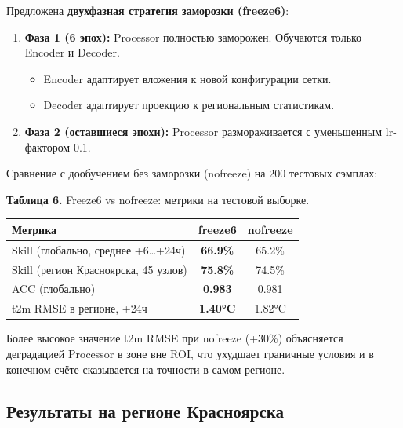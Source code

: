 \documentclass[14pt,a4paper]{extarticle}
\newcounter{none}
\numberwithin{table}{section}
\numberwithin{figure}{section}
\numberwithin{equation}{section}
\providecommand{\tightlist}{%
  \setlength{\itemsep}{0pt}\setlength{\parskip}{0pt}}
\begin{document}
Предложена \textbf{двухфазная стратегия заморозки (freeze6)}:

\begin{enumerate}
\def\labelenumi{\arabic{enumi}.}
\tightlist
\item
  \textbf{Фаза 1 (6 эпох):} Processor полностью заморожен. Обучаются
  только Encoder и Decoder.

  \begin{itemize}
  \tightlist
  \item
    Encoder адаптирует вложения к новой конфигурации сетки.
  \item
    Decoder адаптирует проекцию к региональным статистикам.
  \end{itemize}
\item
  \textbf{Фаза 2 (оставшиеся эпохи):} Processor размораживается с
  уменьшенным lr-фактором 0.1.
\end{enumerate}

Сравнение с дообучением без заморозки (nofreeze) на 200 тестовых
сэмплах:

\textbf{Таблица 6.} Freeze6 vs nofreeze: метрики на тестовой выборке.

{\def\LTcaptype{none} %
\begin{longtable}[]{@{}lcc@{}}
\toprule\noalign{}
Метрика & freeze6 & nofreeze \\
\midrule\noalign{}
\endhead
\bottomrule\noalign{}
\endlastfoot
Skill (глобально, среднее +6\ldots+24ч) & \textbf{66.9\%} & 65.2\% \\
Skill (регион Красноярска, 45 узлов) & \textbf{75.8\%} & 74.5\% \\
ACC (глобально) & \textbf{0.983} & 0.981 \\
t2m RMSE в регионе, +24ч & \textbf{1.40°C} & 1.82°C \\
\end{longtable}
}

Более высокое значение t2m RMSE при nofreeze (+30\%) объясняется
деградацией Processor в зоне вне ROI, что ухудшает граничные условия и в
конечном счёте сказывается на точности в самом регионе.

\subsection{Результаты на регионе Красноярска}\label{ux440ux435ux437ux443ux43bux44cux442ux430ux442ux44b-ux43dux430-ux440ux435ux433ux438ux43eux43dux435-ux43aux440ux430ux441ux43dux43eux44fux440ux441ux43aux430}
\end{document}
